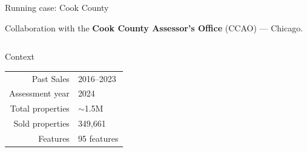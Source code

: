 \documentclass[aspectratio=169,12pt,]{beamer}
\newcommand{\1}{\mathbf{1}}
\begin{document}
\begin{frame}{Running case: Cook County}

\begin{center}
    Collaboration with the \textbf{Cook County Assessor's Office} (CCAO) --- Chicago.
\end{center}




\medskip

\begin{columns}[T,onlytextwidth]
\begin{block}{Context}
\small
\centering
\begin{tabular}{@{}rl@{}}
{Past Sales} & 2016--2023 \\
{Assessment year} & 2024 \\
\midrule
{Total properties} & {$\sim$}{1.5M}  \\
{Sold properties} & {349,661} \\
\midrule
{Features} & {95} features \\
\end{tabular}
\end{block}



\end{columns}
\end{frame}
\end{document}
